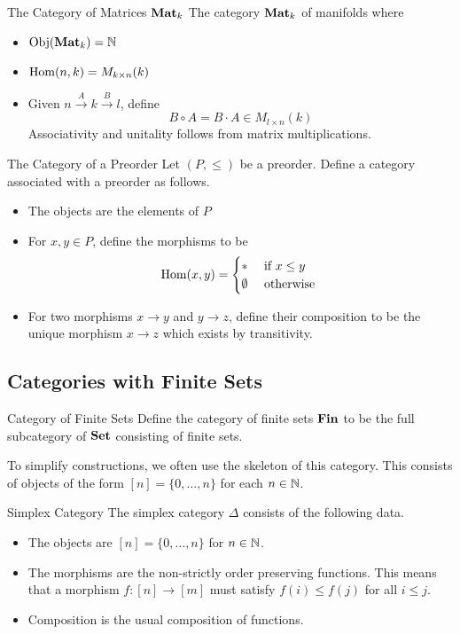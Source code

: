 \documentclass[a4paper]{article}
\begin{document}
\begin{defn}{The Category of Matrices $\bold{Mat}_k$}{} The category $\bold{Mat}_k$ of manifolds where 
\begin{itemize}
\item $\operatorname{Obj}(\bold{Mat}_k)=\mathbb{N}$
\item $\operatorname{Hom}(n,k)=M_{k\times n}(k)$
\item Given $n\overset{A}{\rightarrow}k\overset{B}{\rightarrow}l$, define $$B\circ A=B\cdot A\in M_{l\times n}(k)$$ Associativity and unitality follows from matrix multiplications. 
\end{itemize}
\end{defn}

\begin{defn}{The Category of a Preorder}{} Let $(P,\leq)$ be a preorder. Define a category associated with a preorder as follows. 
\begin{itemize}
\item The objects are the elements of $P$
\item For $x,y\in P$, define the morphisms to be $$\operatorname{Hom}(x,y)=\begin{cases}
\ast & \text{ if } x\leq y\\
\emptyset & \text{ otherwise }
\end{cases}$$
\item For two morphisms $x\to y$ and $y\to z$, define their composition to be the unique morphism $x\to z$ which exists by transitivity. 
\end{itemize}
\end{defn}

\subsection{Categories with Finite Sets}
\begin{defn}{Category of Finite Sets}{} Define the category of finite sets $\bold{Fin}$ to be the full subcategory of $\bold{Set}$ consisting of finite sets. 
\end{defn}

To simplify constructions, we often use the skeleton of this category. This consists of objects of the form $[n]=\{0,\dots,n\}$ for each $n\in\mathbb{N}$. 

\begin{defn}{Simplex Category}{} The simplex category $\Delta$ consists of the following data. 
\begin{itemize}
\item The objects are $[n]=\{0,\dots,n\}$ for $n\in\mathbb{N}$. 
\item The morphisms are the non-strictly order preserving functions. This means that a morphism $f:[n]\to[m]$ must satisfy $f(i)\leq f(j)$ for all $i\leq j$. 
\item Composition is the usual composition of functions. 
\end{itemize}
\end{defn}
\end{document}

